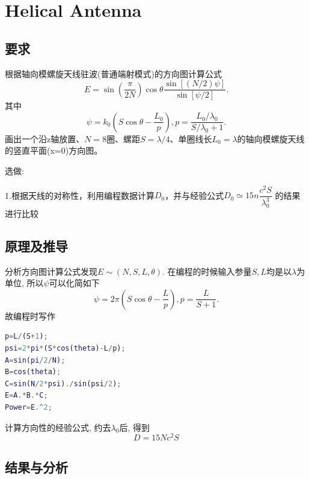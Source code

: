 
\section{Helical Antenna}
\subsection{要求}
\noindent 
根据轴向模螺旋天线驻波(普通端射模式)的方向图计算公式
\begin{equation}
E=\sin\left(\frac{\pi}{2N}\right)\cos\theta\dfrac{\sin\left[\left(N/2\right)\psi\right]}{\sin\left[\psi/2\right]}.
\end{equation}
其中
\begin{equation}
\psi=k_0\left(S\cos\theta-\frac{L_0}{p}\right), p=\frac{L_0/\lambda_0}{S/\lambda_0 +1}.
\end{equation}
画出一个沿z轴放置、$N=8$圈、螺距$S=\lambda/4$、单圈线长$L_0=\lambda$的轴向模螺旋天线的竖直平面(x=0)方向图。

\noindent 选做:

1.根据天线的对称性，利用编程数据计算$D_0$，并与经验公式$D_0\simeq15n\dfrac{c^2S}{\lambda_0^3}$
的结果进行比较


\subsection{原理及推导}
分析方向图计算公式发现$E\sim\left(N,S,L,\theta\right)$. 在编程的时候输入参量$S,L$均是以$\lambda$为单位, 所以$\psi$可以化简如下
\begin{equation}
\psi=2\pi\left(S\cos\theta-\frac{L}{p}\right), p=\frac{L}{S+1}.
\end{equation}
故编程时写作
\begin{lstlisting}[language={matlab},keywordstyle=\color{blue!70},commentstyle=\color{red!50!green!50!blue!50},frame=shadowbox, rulesepcolor=\color{red!20!green!20!blue!20}] 
p=L/(S+1);
psi=2*pi*(S*cos(theta)-L/p);
A=sin(pi/2/N);
B=cos(theta);
C=sin(N/2*psi)./sin(psi/2);
E=A.*B.*C;
Power=E.^2;
\end{lstlisting}

计算方向性的经验公式, 约去$\lambda_0$后, 得到
\begin{equation}
D=15Nc^2 S
\end{equation}
\subsection{结果与分析}
